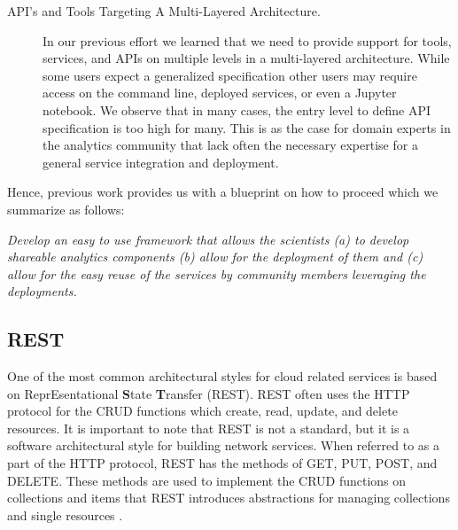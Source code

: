 \begin{description}
\item[API's and Tools Targeting A Multi-Layered Architecture.] In our
  previous effort we learned that we need to provide support for
  tools, services, and APIs on multiple levels in a multi-layered
  architecture. While some users expect a generalized specification
  other users may require access on the command line, deployed
  services, or even a Jupyter notebook. We observe that in many cases,
  the entry level to define API specification is too high for
  many. This is as the case for domain experts in the analytics community that lack often the necessary expertise for a general service integration and deployment.

\end{description}

Hence, previous work provides us with a blueprint on how to proceed which we summarize as 
follows:

{\em Develop an easy to use framework that allows the scientists (a) to develop shareable analytics components (b) allow for the deployment of them and (c) allow for the easy reuse of the services by community members leveraging the deployments.} 



\subsection{REST}\label{rest}

One of the most common architectural styles for cloud related services is based on {\BF R}epr{\BF E}sentational {\bf S}tate {\bf T}ransfer (REST). REST often uses
the HTTP protocol for the CRUD functions which create, read, update, and
delete resources. It is important to note that REST is not a standard,
but it is a software architectural style for building network services.
When referred to as a part of the HTTP protocol, REST has the methods of
GET, PUT, POST, and DELETE. These methods are used to implement the CRUD
functions on collections and items that REST introduces abstractions for managing collections and single resources \cite{las-book-cloud}.
 
